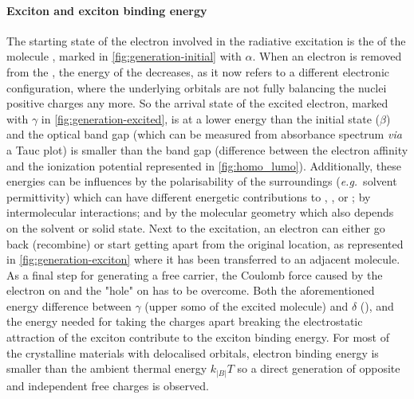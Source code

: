 		\paragraph{Exciton and exciton binding energy}\label{intro_exciton}
		The starting state of the electron involved in the radiative excitation is the  of the molecule , marked in \cref{fig:generation-initial} with $\alpha$.
		When an electron is removed from the , the energy of the  decreases, as it now refers to a different electronic configuration, where the underlying orbitals are not fully balancing the nuclei positive charges any more.
		So the arrival state of the excited electron, marked with $\gamma$ in \cref{fig:generation-excited}, is at a lower energy than the initial state  ($\beta$) and the optical band gap (which can be measured from absorbance spectrum \textsl{via} a Tauc plot) is smaller than the band gap (difference between the electron affinity and the ionization potential represented in \cref{fig:homo_lumo}).
		Additionally, these energies can be influences by the polarisability of the surroundings (\textsl{e.g.}\ solvent permittivity) which can have different energetic contributions to , , or ; by intermolecular interactions; and by the molecular geometry which also depends on the solvent or solid state.
		Next to the excitation, an electron can either go back (recombine) or start getting apart from the original location, as represented in \cref{fig:generation-exciton} where it has been transferred to an adjacent molecule.
		As a final step for generating a free carrier, the Coulomb force caused by the electron on  and the "hole" on  has to be overcome.
		Both the aforementioned energy difference between $\gamma$ (upper \gls{somo} of the excited molecule) and $\delta$ (), and the energy needed for taking the charges apart breaking the electrostatic attraction of the exciton contribute to the exciton binding energy.
		For most of the crystalline materials with delocalised orbitals, electron binding energy is smaller than the ambient thermal energy $k_|B|T$ so a direct generation of opposite and independent free charges is observed.

